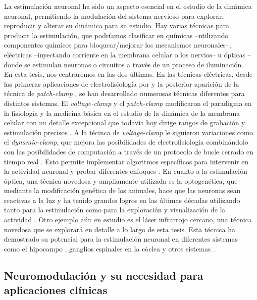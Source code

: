 La estimulación neuronal ha sido un aspecto esencial en el estudio de la dinámica neuronal, permitiendo la modulación del sistema nervioso para explorar, reproducir y alterar su dinámica para su estudio. Hay varias técnicas para producir la estimulación, que podríamos clasificar en químicas --utilizando componentes químicos para bloquear/mejorar los mecanismos neuronales--, eléctricas --inyectando corriente en la membrana celular o los nervios-- u ópticas --donde se estimulan neuronas o circuitos a través de un proceso de iluminación. En esta tesis, nos centraremos en las dos últimas. En las técnicas eléctricas, desde las primeras aplicaciones de electrofisiología por \textcite{neher_single-channel_1976} y la posterior aparición de la técnica de \textit{patch-clamp} \textcite{hamill_improved_1981}, se han desarrollado numerosas técnicas diferentes para distintos sistemas. El \textit{voltage-clamp }y el \textit{patch-clamp} modificaron el paradigma en la fisiología y la medicina básica en el estudio de la dinámica de la membrana celular con un detalle excepcional que todavía hoy dirige rangos de grabación y estimulación precisos \parencite{hamill_improved_1981}. A la técinca de \textit{voltage-clamp} le siguieron variaciones como el \textit{dynamic-clamp}, que mejora las posibilidades de electrofisiología combinándolo con las posibilidades de computación a través de un protocolo de bucle cerrado en tiempo real \parencite{nowotny_dynamic_2022}. Esto permite implementar algoritmos específicos para intervenir en la actividad neuronal y probar diferentes enfoques \parencite{chamorro_generalization_2012}. En cuanto a la estimulación óptica, una técnica novedosa y ampliamente utilizada es la optogenética, que mediante la modificación genética de los animales, hace que las neuronas sean reactivas a la luz y ha tenido grandes logros en las últimas décadas utilizando tanto para la estimulación como para la exploración y visualización de la actividad \parencite{chen_roles_2022}. Otro ejemplo aún en estudio es el láser infrarrojo cercano, una técnica novedosa que se explorará en detalle a lo largo de esta tesis. Esta técnica ha demostrado su potencial para la estimulación neuronal en diferentes sistemas como el hipocampo \parencite{liang_temperature-dependent_2009}, ganglios espinales en la cóclea \parencite{goyal_acute_2012, barrett_pulsed_2018, brown_thermal_2020} y otros sistemas \parencite{shapiro_infrared_2012, cayce_infrared_2014, begeng_activity_2022}.

\subsection{Neuromodulación y su necesidad para aplicaciones clínicas}

